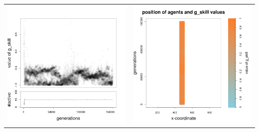 \documentclass[a4paper,10pt]{article}
\begin{document}
\begin{table}[h!]
\begin{tabular}{cc}
\newline
\includegraphics[width=\imgSize]{images/5StaticEnv/Gplot62_staticEnv0}&\includegraphics[width=\imgSize]{images/5StaticEnv/Gplot62Static_staticEnv0}\\

\end{tabular}
\end{table}
\end{document}
